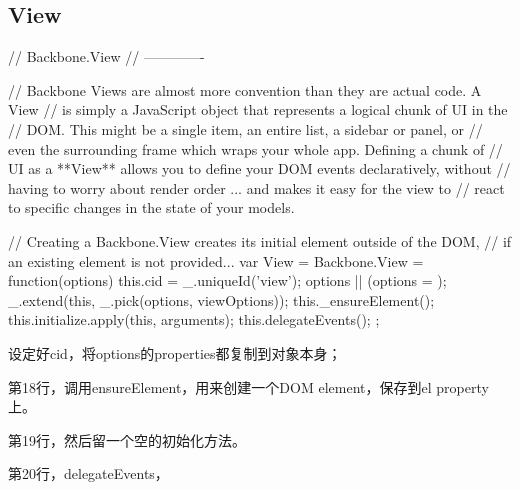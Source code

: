 \subsection{View}

\begin{JavaScript}
  // Backbone.View
  // -------------

  // Backbone Views are almost more convention than they are actual code. A View
  // is simply a JavaScript object that represents a logical chunk of UI in the
  // DOM. This might be a single item, an entire list, a sidebar or panel, or
  // even the surrounding frame which wraps your whole app. Defining a chunk of
  // UI as a **View** allows you to define your DOM events declaratively, without
  // having to worry about render order ... and makes it easy for the view to
  // react to specific changes in the state of your models.

  // Creating a Backbone.View creates its initial element outside of the DOM,
  // if an existing element is not provided...
  var View = Backbone.View = function(options) {
    this.cid = _.uniqueId('view');
    options || (options = {});
    _.extend(this, _.pick(options, viewOptions));
    this._ensureElement();
    this.initialize.apply(this, arguments);
    this.delegateEvents();
  };
\end{JavaScript}

设定好cid，将options的properties都复制到对象本身；

第18行，调用ensureElement，用来创建一个DOM element，保存到el property上。

第19行，然后留一个空的初始化方法。

第20行，delegateEvents，


